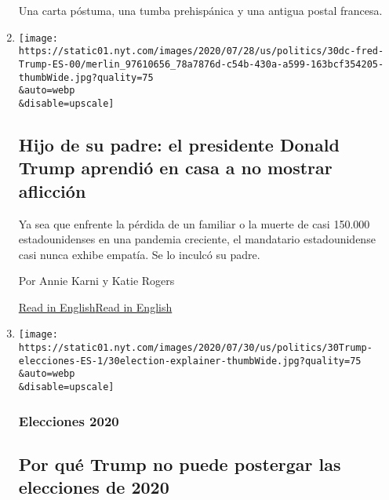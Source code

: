 \begin{enumerate}
  Una carta póstuma, una tumba prehispánica y una antigua postal
  francesa.
\item
  \href{/es/2020/07/31/espanol/estados-unidos/fred-trump-donald-trump.html}{}

  \texttt{[image: https://static01.nyt.com/images/2020/07/28/us/politics/30dc-fred-Trump-ES-00/merlin\_97610656\_78a7876d-c54b-430a-a599-163bcf354205-thumbWide.jpg?quality=75\\\&auto=webp\\\&disable=upscale]}

  \hypertarget{hijo-de-su-padre-el-presidente-donald-trump-aprendiuxf3-en-casa-a-no-mostrar-aflicciuxf3n}{%
  \subsection{Hijo de su padre: el presidente Donald Trump aprendió en
  casa a no mostrar
  aflicción}\label{hijo-de-su-padre-el-presidente-donald-trump-aprendiuxf3-en-casa-a-no-mostrar-aflicciuxf3n}}

  Ya sea que enfrente la pérdida de un familiar o la muerte de casi
  150.000 estadounidenses en una pandemia creciente, el mandatario
  estadounidense casi nunca exhibe empatía. Se lo inculcó su padre.

  Por Annie Karni y Katie Rogers

  \href{https://www.nytimes.com/2020/07/28/us/politics/donald-fred-trump.html}{Read
  in
  English}\href{https://www.nytimes.com/2020/07/28/us/politics/donald-fred-trump.html}{Read
  in English}
\item
  \href{/es/2020/07/30/espanol/estados-unidos/trump-retrasar-elecciones.html}{}

  \texttt{[image: https://static01.nyt.com/images/2020/07/30/us/politics/30Trump-elecciones-ES-1/30election-explainer-thumbWide.jpg?quality=75\\\&auto=webp\\\&disable=upscale]}

  \hypertarget{elecciones-2020}{%
  \subsubsection{Elecciones 2020}\label{elecciones-2020}}

  \hypertarget{por-quuxe9-trump-no-puede-postergar-las-elecciones-de-2020}{%
  \subsection{Por qué Trump no puede postergar las elecciones de
  2020}\label{por-quuxe9-trump-no-puede-postergar-las-elecciones-de-2020}}


\end{enumerate}
